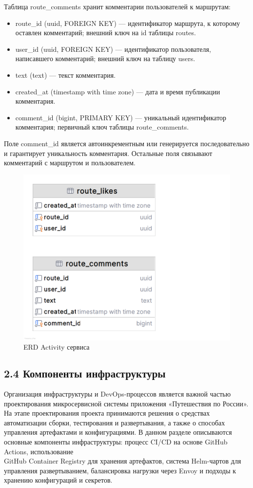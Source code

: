 Таблица route\_comments хранит комментарии пользователей к маршрутам:
\begin{itemize}
    \item route\_id (uuid, FOREIGN KEY) — идентификатор маршрута, к которому оставлен комментарий; внешний ключ на id таблицы routes.
    \item user\_id (uuid, FOREIGN KEY) — идентификатор пользователя, написавшего комментарий; внешний ключ на таблицу users.
    \item text (text) — текст комментария.
    \item created\_at (timestamp with time zone) — дата и время публикации комментария.
    \item comment\_id (bigint, PRIMARY KEY) — уникальный идентификатор комментария; первичный ключ таблицы route\_comments.
\end{itemize}
\noindent Поле comment\_id является автоинкрементным или генерируется последовательно и гарантирует уникальность комментария. Остальные поля связывают комментарий с маршрутом и пользователем.
\begin{figure}[H]
        \centering
        \includegraphics[width=0.8\linewidth]{Images/second_chapter_backend_architecture/Picture13.png}
        \caption{ERD Activity сервиса}
        \label{fig:activity-service-erd}
\end{figure}

\subsection*{2.4 Компоненты инфраструктуры}
Организация инфраструктуры и DevOps-процессов является важной частью проектирования микросервисной системы приложения «Путешествия по России». На этапе проектирования проекта принимаются решения о средствах автоматизации сборки, тестирования и развертывания, а также о способах управления артефактами и конфигурациями. В данном разделе описываются основные компоненты инфраструктуры: процесс CI/CD на основе GitHub Actions, использование \\ GitHub Container Registry для хранения артефактов, система Helm-чартов для управления развертыванием, балансировка нагрузки через Envoy и подходы к хранению конфигураций и секретов.

